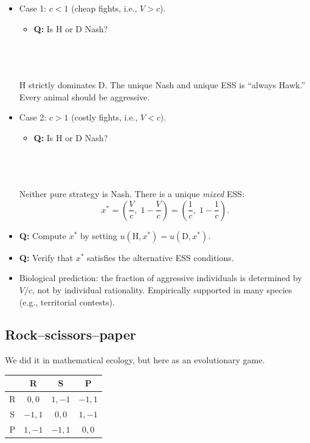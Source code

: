 \documentclass[20pt]{extarticle}
\begin{document}
\begin{itemize}
\item Case 1: $c < 1$ (cheap fights, i.e., $V > c$).
	\begin{itemize}
	\item \textbf{Q:} Is H or D Nash?
	\end{itemize}
	\ \\
	\ \\
	\ \\
H strictly dominates D. The unique Nash and unique ESS is ``always Hawk.'' Every animal should be aggressive.
%
\item Case 2: $c > 1$ (costly fights, i.e., $V < c$).
	\begin{itemize}
	\item \textbf{Q:} Is H or D Nash?
	\end{itemize}
	\ \\
	\ \\
	\ \\
Neither pure strategy is Nash. There is a unique \emph{mixed} ESS:
\[ x^* = \left( \frac{V}{c},\; 1 - \frac{V}{c} \right) = \left( \frac{1}{c},\; 1 - \frac{1}{c} \right). \]
\item \textbf{Q:} Compute $x^*$ by setting $u(\text{H},x^*) = u(\text{D},x^*)$.
\item \textbf{Q:} Verify that $x^*$ satisfies the alternative ESS conditions.
\item Biological prediction: the fraction of aggressive individuals is determined by $V/c$, not by individual rationality. Empirically supported in many species (e.g., territorial contests).
\end{itemize}

\subsection*{Rock--scissors--paper}

We did it in mathematical ecology, but here as an evolutionary game.
\begin{center}
\begin{tabular}{|c||c|c|c|}
\hline
 & R & S & P \\
\hline\hline
R & $0,0$ & $1,-1$ & $-1,1$ \\
\hline
S & $-1,1$ & $0,0$ & $1,-1$ \\
\hline
P & $1,-1$ & $-1,1$ & $0,0$ \\
\hline
\end{tabular}
\end{center}
\end{document}
